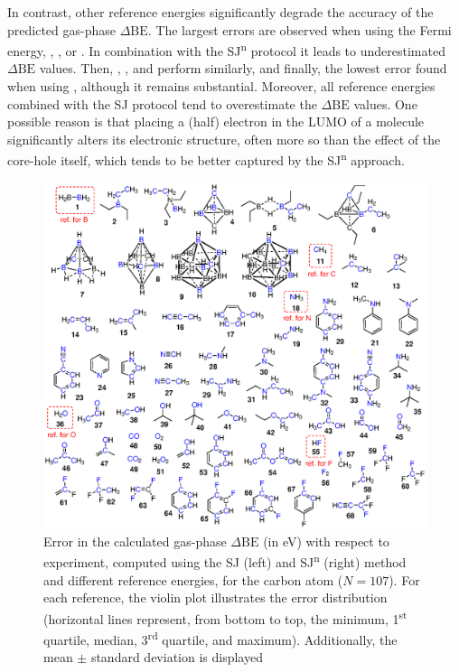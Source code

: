 \documentclass[journal=jpccck,manuscript=article]{achemso}
\def\dbe{\ensuremath{\Delta\text{BE}}}
\begin{document}
In contrast, other reference energies significantly degrade the accuracy of the predicted gas-phase \dbe{}. The largest errors are observed when using the Fermi energy, , , or . In combination with the SJ\textsuperscript{n} protocol it leads to underestimated \dbe{} values. Then, , , and  perform similarly, and finally, the lowest error found when using \cp{\phi}, although it remains substantial. Moreover, all reference energies combined with the SJ protocol tend to overestimate the \dbe{} values. One possible reason is that placing a (half) electron in the LUMO of a molecule significantly alters its electronic structure, often more so than the effect of the core-hole itself, which tends to be better captured by the SJ\textsuperscript{n} approach.\cite{taucherFinalStateSimulationsCoreLevel2020}



\begin{figure}[!h]
	\centering
	\includegraphics[width=\linewidth]{Figure3}
	\caption{Error in the calculated gas-phase \dbe{}  (in \si{\electronvolt}) with respect to experiment, computed using the SJ (left) and SJ\textsuperscript{n} (right) method and different reference energies, for the carbon atom ($N=107$). For each reference, the violin plot illustrates the error distribution (horizontal lines represent, from bottom to top, the minimum, 1\textsuperscript{st} quartile, median, 3\textsuperscript{rd} quartile, and maximum). Additionally, the mean $\pm$ standard deviation is displayed}
	\label{fig:xps_C185_C}
\end{figure}
\end{document}
